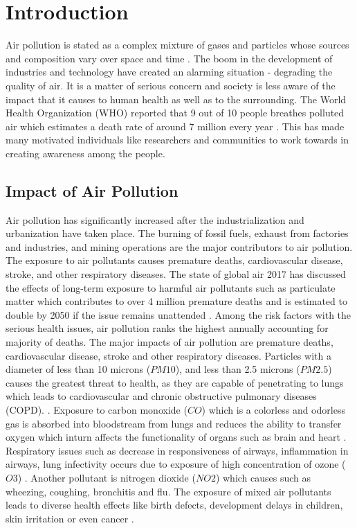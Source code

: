 \chapter{Introduction}
\setcounter{page}{1}


Air pollution is stated as a complex mixture of gases and particles whose sources and composition vary over
space and time \cite{HealthEffectsInstitute2017}. The boom in the development of industries and technology have created an alarming situation - degrading the quality of air. It is a matter of serious concern and society is less aware of the impact that it causes to human health as well as to the surrounding. The World Health Organization (WHO) reported that 9 out of 10 people breathes polluted air which estimates a death rate of around 7 million every year \cite{who} \cite{WHO2010}. This has made many motivated individuals like researchers and communities to work towards in creating awareness among the people.

\section{Impact of Air Pollution}

Air pollution has significantly increased after the industrialization and urbanization have taken place. The burning of fossil fuels, exhaust from factories and industries, and mining operations are the major contributors to air pollution. The exposure to air pollutants causes premature deaths, cardiovascular disease, stroke, and other respiratory diseases. The state of global air 2017 has discussed the effects of long-term exposure to harmful air pollutants such as particulate matter which contributes to over 4 million premature deaths and is estimated to
double by 2050 if the issue remains unattended \cite{HealthEffectsInstitute2017}. Among the risk factors with the serious health issues, air pollution ranks the highest annually accounting for majority of deaths. The major impacts of air pollution are premature deaths, cardiovascular disease, stroke and other respiratory diseases.
Particles with a diameter of less than 10 microns ($PM10$), and less than 2.5 microns ($PM2.5$) causes the greatest threat to health, as they are capable of penetrating to lungs which leads to cardiovascular and chronic obstructive pulmonary diseases (COPD). \cite{who} \cite{Tian2016}. Exposure to carbon monoxide ($CO$) which is a colorless and odorless gas is absorbed into bloodstream from lungs and reduces the ability to transfer oxygen which inturn affects the functionality of organs such as brain and heart \cite{Sierra-vargas2012} \cite{Golbabaei2012}. Respiratory issues such as decrease in responsiveness of airways, inflammation in airways, lung infectivity occurs due to exposure of high concentration of ozone ($O3$) \cite{Lippmann1989}. Another pollutant is nitrogen dioxide ($NO2$) which causes such as wheezing, coughing, bronchitis and flu. The exposure of mixed air pollutants leads to diverse health effects like birth defects, development delays in children, skin irritation or even cancer \cite{MarilenaKampa2007}.


